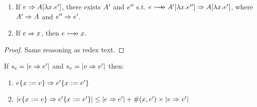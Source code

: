 \documentclass{article}
\begin{document}
%
%
\begin{lemma}
\label{lem:srstepans}$\;$
\begin{enumerate}
\item If $e \Rightarrow A[\lambda x_{}.{e}']$, there exists $A'$ and $e''$ s.t. $\e
  \srsteps \inA[']{\lx\e''} \pstep \inA{\lx\e'}$, where $A' \Rightarrow A$ and
  $e'' \Rightarrow e'$.
\item If $e \Rightarrow x$, then $\e \srsteps x$.
\end{enumerate}
\end{lemma}
\begin{proof}
Same reasoning as redex text.
\end{proof}





\pagebreak



\newcommand{\sizesubstx}[2]{\size{\substx{#1}{\val} \pstep \substx{#2}{\val'}}}
\newcommand{\sizeRHS}[2]
           {\size{#1 \pstep #2} + \numfvx{#2} \times \size{\val \pstep \val'} }

\newcommand{\sizeIH}[2]{ \sizesubstx{#1}{#2} \leq \sizeRHS{#1}{#2} }

%
%
\begin{lemma}[Size]
\label{lem:size}
If $s_e = |e \Rightarrow e'|$ and $s_v = |v \Rightarrow v'|$ then:
\begin{enumerate}
\item $e\{x_{} := v\} \Rightarrow e'\{x_{} := v'\}$
\item $\sizeIH{\e}{\e'}$
\end{enumerate}
\end{lemma}
\end{document}
